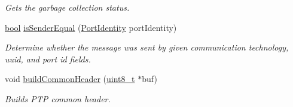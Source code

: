 \begin{DoxyCompactItemize}
\begin{DoxyCompactList}\small\item\em Gets the garbage collection status. \end{DoxyCompactList}\item 
\hyperlink{avb__gptp_8h_af6a258d8f3ee5206d682d799316314b1}{bool} \hyperlink{class_p_t_p_message_common_aa13b7c21bfbc95ca14890dea687da20b}{is\+Sender\+Equal} (\hyperlink{class_port_identity}{Port\+Identity} port\+Identity)
\begin{DoxyCompactList}\small\item\em Determine whether the message was sent by given communication technology, uuid, and port id fields. \end{DoxyCompactList}\item 
void \hyperlink{class_p_t_p_message_common_a66c6d7a38fc74d84b68e13216c82a4e6}{build\+Common\+Header} (\hyperlink{stdint_8h_aba7bc1797add20fe3efdf37ced1182c5}{uint8\+\_\+t} $\ast$buf)
\begin{DoxyCompactList}\small\item\em Builds P\+TP common header. \end{DoxyCompactList}\end{DoxyCompactItemize}
